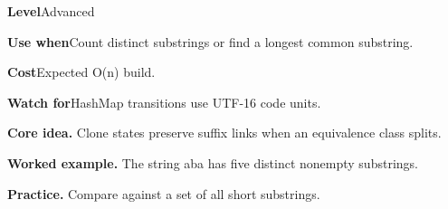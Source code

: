 \documentclass[10pt,letterpaper]{article}
\newcommand{\entrylabel}[1]{\textcolor{accent}{\bfseries #1}}
\begin{document}
\begin{guidebox}\small
\entrylabel{Level}\quad Advanced\par
\entrylabel{Use when}\quad Count distinct substrings or find a longest common substring.\par
\entrylabel{Cost}\quad Expected O(n) build.\par
\entrylabel{Watch for}\quad HashMap transitions use UTF-16 code units.\par
\end{guidebox}
\noindent\textbf{Core idea.} Clone states preserve suffix links when an equivalence class splits.\par
\noindent\textbf{Worked example.} The string aba has five distinct nonempty substrings.\par
\noindent\textbf{Practice.} Compare against a set of all short substrings.\par
\end{document}
